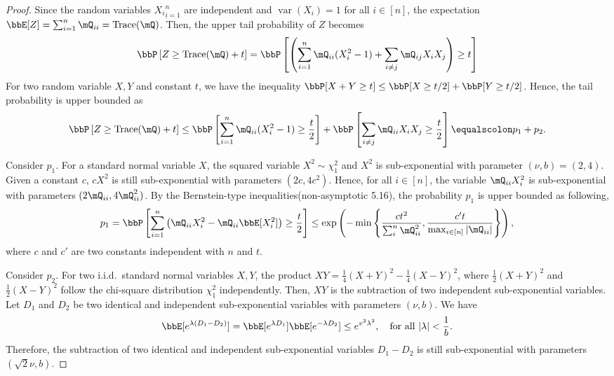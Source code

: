 \documentclass[11pt]{article}
\DeclareMathOperator{\var}{var}
\DeclareMathOperator{\tr}{Trace}
\newcommand{\of}[1]{\left(#1\right)}
\newcommand{\off}[1]{\left[#1\right]}
\newcommand{\offf}[1]{\left\{#1\right\}}
\theoremstyle{plain}
\theoremstyle{definition}
\begin{document}
    \begin{proof}
    	Since the random variables ${X_i}_{i=1}^n$ are independent and $\var(X_i) = 1$ for all $i \in [n]$, the expectation $\bbE[Z] = \sum_{i = 1}^{n} \mQ_{ii} = \tr(\mQ)$. Then, the upper tail probability of $Z$ becomes
    	\begin{equation}
    		\bbP \off{ Z \geq \tr(\mQ) +  t } = \bbP \off{ \of{  \sum_{i = 1}^{n} \mQ_{ii} (X^2_i - 1) + \sum_{i \neq j} \mQ_{ij} X_i X_j }\geq t   }
    	\end{equation}
    	For two random variable $X,Y$ and constant $t$, we have the inequality $ \bbP[X+Y \geq t] \leq \bbP[X \geq t/2] + \bbP[Y \geq t/2]$. Hence, the tail probability is upper bounded as
    	\begin{equation}
    		\bbP \off{ Z \geq \tr(\mQ) +  t } \leq \bbP\off{ \sum_{i =1 }^n \mQ_{ii}(X_i^2 - 1) \geq \frac{t}{2}  } + \bbP \off{ \sum_{i \neq j} \mQ_{ii} X_i X_j  \geq \frac{t}{2}} \equalscolon p_1 + p_2.
    	\end{equation} 
    	
    	Consider $p_1$. For a standard normal variable $X$,  the squared variable $X^2 \sim \chi^2_1$ and $X^2$ is sub-exponential with parameter $(\nu, b) = (2,4)$. Given a constant $c$, $cX^2$ is still sub-exponential with parameters $(2 c, 4 c^2)$. Hence, for all $i \in [n]$, the variable $\mQ_{ii} X_i^2$ is sub-exponential with parameters $(2 \mQ_{ii}, 4 \mQ^2_{ii} )$. By the Bernstein-type inequalities(non-asymptotic 5.16), the probability $p_1$ is upper bounded as following,
    	\begin{equation}
    		p_1 = \bbP \off{\sum_{i=1}^n { \of{ \mQ_{ii}X^2_i - \mQ_{ii}\bbE[X^2_i]   } \geq \frac{t}{2} }} \leq \exp \of{ - \min \offf{  \frac{c t^2}{\sum_{i}^n \mQ^2_{ii} }, \frac{c't}{\max_{i \in [n]  }|\mQ_{ii}| } }},
    	\end{equation}
    	where $c$ and $c'$ are two constants independent with $n$ and $t$.
    	
    	\vspace{0.2cm}
    	
    	Consider $p_2$. For two i.i.d.\ standard normal variables $X,Y$, the product $XY = \frac{1}{4}(X+Y)^2 - \frac{1}{4}(X-Y )^2$, where $ \frac{1}{2} (X+Y)^2$ and $\frac{1}{2} (X-Y)^2$ follow the chi-square distribution $\chi^2_1$ independently. Then, $XY$ is the subtraction of two independent sub-exponential variables. Let $D_1$ and $D_2$ be two identical and independent sub-exponential variables with parameters $(\nu, b)$. We have
    	\[ \bbE[e^{\lambda (D_1-D_2)}] = \bbE[e^{\lambda D_1}] \bbE[e^{-\lambda D_2}] \leq e^{v^2 \lambda^2}, \quad \text{for all } |\lambda | < \frac{1}{b}.  \]
    	Therefore, the subtraction of two identical and independent sub-exponential variables $D_1 -D_2$ is still sub-exponential with parameters $(\sqrt{2}\nu, b)$.
    	

\end{proof}
\end{document}

